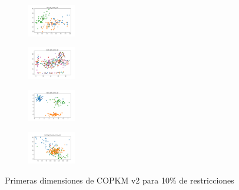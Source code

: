 \begin{figure}[H]
\begin{subfigure}
    \end{subfigure}
    \hfill
    \begin{subfigure}
        \centering
        \includegraphics[width=0.234\textwidth]{img/hs-ls-v2/iris_set_const_10_3773969821_clust.png}
    \end{subfigure}
    \hfill
    \begin{subfigure}
        \centering
        \includegraphics[width=0.234\textwidth]{img/hs-ls-v2/ecoli_set_const_10_3773969821_clust.png}
    \end{subfigure}
    \hfill
    \begin{subfigure}
        \centering
        \includegraphics[width=0.234\textwidth]{img/hs-ls-v2/rand_set_const_10_3773969821_clust.png}
    \end{subfigure}
    \hfill
    \begin{subfigure}
        \centering
        \includegraphics[width=0.234\textwidth]{img/hs-ls-v2/newthyroid_set_const_10_3773969821_clust.png}
    \end{subfigure}
    \caption{Primeras dimensiones de COPKM v2 para 10\% de restricciones}
\end{figure}

\vspace*{\fill}
\newpage
\vspace*{\fill}

